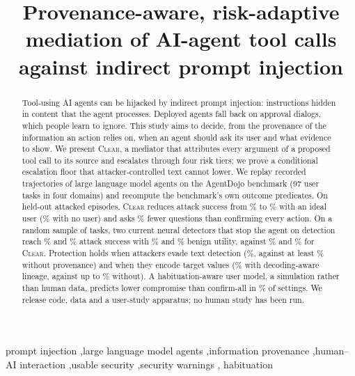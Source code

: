 \documentclass[preprint,12pt,nonatbib]{elsarticle}
\theoremstyle{remark}
\newcommand{\clear}{\textsc{Clear}}
\begin{document}
\begin{frontmatter}

\title{Provenance-aware, risk-adaptive mediation of AI-agent tool calls against
indirect prompt injection}


\begin{abstract}
Tool-using AI agents can be hijacked by indirect prompt injection: instructions
hidden in content that the agent processes. Deployed
agents fall back on approval dialogs, which people learn to ignore. This study
aims to decide, from the provenance of the information an action relies on,
when an agent should ask its user and what evidence to show. We present
\clear{}, a mediator that attributes every argument of a proposed tool call to
its source and escalates through four risk tiers; we prove a conditional escalation floor that
attacker-controlled text cannot lower. We replay \nEpisodes{} recorded
trajectories of \nModels{} large language model agents on the AgentDojo
benchmark (97 user tasks in four domains) and recompute the benchmark's own
outcome predicates. On \nHeldAtt{} held-out attacked episodes, \clear{} reduces
attack success from \asrNone\% to \asrClearO\% with an ideal user
(\asrClearA\% with no user) and asks \dlgReduction\% fewer questions than
confirming every action. On a random sample of \nDetTasks{} tasks, two current
neural detectors that stop the agent on detection reach \asrPai\% and
\asrPig\% attack success with \buPai\% and \buPig\% benign utility, against
\asrClearOS\% and \buClearOS\% for \clear{}. Protection holds when attackers
evade text detection (\asrEvadeClear\%, against at least \asrEvadeNoProvMin\%
without provenance) and when they encode target values (\laundVtwoVal\% with
decoding-aware lineage, against up to \laundVoneMax\% without). A
habituation-aware user model, a simulation rather than human data, predicts
lower compromise than confirm-all in \simShare\% of \simGridN{} settings. We
release code, data and a user-study apparatus; no human study has been run.
\end{abstract}


\begin{keyword}
prompt injection \sep large language model agents \sep information provenance
\sep human--AI interaction \sep usable security \sep security warnings \sep
habituation
\end{keyword}

\end{frontmatter}
\linenumbers   %
\end{document}
